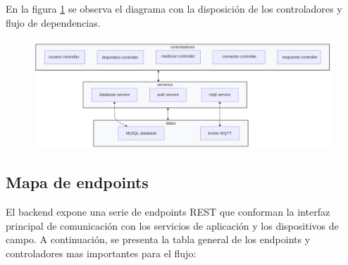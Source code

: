 En la figura \ref{fig:diagrama_controladores} se observa el diagrama con la disposición de los controladores y flujo de dependencias.

\begin{figure}[H]
 
  \centering
  \includegraphics[scale=0.11]{./Figures/diagDispoControlladores.png}
  \label{fig:diagrama_controladores}
  \end{figure}



\subsection{Mapa de endpoints}

El backend expone una serie de endpoints REST que conforman la interfaz principal de comunicación con los servicios de aplicación y los dispositivos de campo.  
A continuación, se presenta la tabla general de los endpoints y controladores mas importantes para el flujo:

